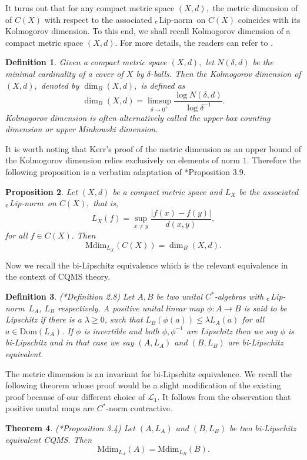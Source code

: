 \documentclass[a4paper,11pt,reqno]{amsart}
\theoremstyle{plain}
\newtheorem{thm}{Theorem}[section]
\newtheorem{prop}[thm]{Proposition}
\newtheorem{defn}[thm]{Definition}
\theoremstyle{mainthmstyle}
\theoremstyle{named}
\numberwithin{equation}{section}
\newcommand{\clipnorm}{$_{\text{\rm c}}$Lip-norm}
\begin{document}
It turns out that for any compact metric space $(X, d),$ the metric dimension of of $C (X)$ with respect to the associated \clipnorm\ on $C (X)$ coincides with its Kolmogorov dimension. To this end, we shall recall Kolmogorov dimension of a compact metric space $(X, d).$ For more details, the readers can refer to \cites{MR124720, MR1187754}.
\begin{defn}
Given a compact metric space $(X, d),$ let $N (\delta, d)$ be the minimal cardinality of a cover of $X$ by $\delta$-balls. Then the \textit {Kolmogorov dimension} of $(X, d),$ denoted by $\dim_B (X, d),$ is defined as 
$$\dim_B (X, d) = \limsup\limits_{\delta \to 0^{+}} \frac {\log N (\delta, d)} {\log \delta^{-1}}.$$
Kolmogorov dimension is often alternatively called the \textit {upper box counting dimension} or \textit {upper Minkowski dimension}.
\end{defn}
It is worth noting that Kerr’s proof of the metric dimension as an upper bound of the Kolmogorov dimension relies exclusively on elements of norm $1.$ Therefore the following proposition is a verbatim adaptation of \cite{Kerr}*{Proposition 3.9}. 
\begin{prop}
Let $(X, d)$ be a compact metric space and $L_X$ be the associated \clipnorm\ on $C (X),$ that is, $$L_X (f) = \sup\limits_{x \neq y} \frac {\left \lvert f (x) - f (y) \right \rvert} {d (x, y)},$$ for all $f \in C (X).$ Then
$$\mathrm {Mdim}_{L_X} (C (X)) = \dim_B (X, d).$$
\end{prop}
Now we recall the bi-Lipschitz equivalence which is the relevant equivalence in the context of CQMS theory.
\begin{defn}
    \label{bi-lipschitz_equivalence}(\cite{Kerr}*{Definition 2.8}) Let $A,B$ be two unital $C^{\ast}$-algebras with \clipnorm\ $L_{A}$, $L_{B}$ respectively. A positive unital linear map $\phi:A\rightarrow B$ is said to be Lipschitz if there is a $\lambda\geq 0$, such that $L_{B}(\phi(a))\leq \lambda L_{A}(a)$ for all $a\in \mathrm{Dom}(L_{A})$. If $\phi$ is invertible and both $\phi,\phi^{-1}$ are Lipschitz then we say $\phi$ is bi-Lipschitz and in that case we say $(A,L_A)$ and $(B,L_B)$ are bi-Lipschitz equivalent.
\end{defn}
The metric dimension is an invariant for bi-Lipschitz equivalence. We recall the following theorem whose proof would be a slight modification of the existing proof because of our different choice of $\mathcal{L}_1$. It follows from the observation that positive unutal maps are $C^{\ast}$-norm contractive.
\begin{thm}
    \label{Metric_inv}(\cite{Kerr}*{Proposition 3.4}) Let $(A,L_A)$ and $(B,L_{B})$ be two bi-Lipschitz equivalent CQMS. Then 
    \begin{displaymath}
        \mathrm{Mdim}_{L_A}(A)=\mathrm{Mdim}_{L_{B}}(B).
    \end{displaymath}
\end{thm}
\end{document}
